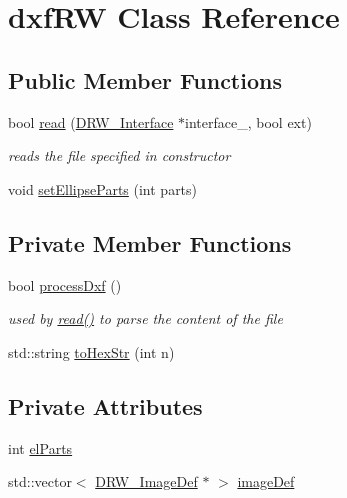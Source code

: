\hypertarget{classdxf_r_w}{}\section{dxf\+R\+W Class Reference}
\label{classdxf_r_w}
\subsection*{Public Member Functions}
\begin{DoxyCompactItemize}
\item 
bool \hyperlink{classdxf_r_w_ab3262753c90b34d8911691cdddaf7bfa}{read} (\hyperlink{class_d_r_w___interface}{D\+R\+W\+\_\+\+Interface} $\ast$interface\+\_\+, bool ext)
\begin{DoxyCompactList}\small\item\em reads the file specified in constructor \end{DoxyCompactList}\item 
void \hyperlink{classdxf_r_w_a6eb61de3ea383636bedc049d23d7e759}{set\+Ellipse\+Parts} (int parts)
\end{DoxyCompactItemize}
\subsection*{Private Member Functions}
\begin{DoxyCompactItemize}
\item 
\hypertarget{classdxf_r_w_ab0d6afb7e2d297a292fcf2fe8af742b8}{}bool \hyperlink{classdxf_r_w_ab0d6afb7e2d297a292fcf2fe8af742b8}{process\+Dxf} ()\label{classdxf_r_w_ab0d6afb7e2d297a292fcf2fe8af742b8}

\begin{DoxyCompactList}\small\item\em used by \hyperlink{classdxf_r_w_ab3262753c90b34d8911691cdddaf7bfa}{read()} to parse the content of the file \end{DoxyCompactList}\item 
std\+::string \hyperlink{classdxf_r_w_ac8c55be7454779ae2039aca405049860}{to\+Hex\+Str} (int n)
\end{DoxyCompactItemize}
\subsection*{Private Attributes}
\begin{DoxyCompactItemize}
\item 
int \hyperlink{classdxf_r_w_aee251f0e7de9a814aa04b3cc9f2fa7a8}{el\+Parts}
\item 
std\+::vector$<$ \hyperlink{class_d_r_w___image_def}{D\+R\+W\+\_\+\+Image\+Def} $\ast$ $>$ \hyperlink{classdxf_r_w_ad90dd62fa6c58393eeb6baea1c777175}{image\+Def}
\end{DoxyCompactItemize}


